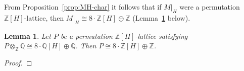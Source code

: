 \documentclass[12pt,a4paper]{article}
\newtheorem{lemma}[theorem]{Lemma}
\theoremstyle{definition}
\begin{document}
From Proposition~\ref{prop:MH-char} it follows that if \(M|_H\) were a
permutation \(\mathbb{Z}[H]\)-lattice, then \(M|_H \cong 8\cdot\mathbb{Z}[H]
\oplus \mathbb{Z}\) (Lemma~\ref{lem:perm-class} below).

\begin{lemma}\label{lem:perm-class}
Let \(P\) be a permutation \(\mathbb{Z}[H]\)-lattice satisfying
\(P \otimes_{\mathbb{Z}} \mathbb{Q} \cong 8\cdot\mathbb{Q}[H] \oplus
\mathbb{Q}\). Then \(P \cong 8\cdot\mathbb{Z}[H] \oplus \mathbb{Z}\).
\end{lemma}

\begin{proof}
%
%
%

\end{proof}
\end{document}
